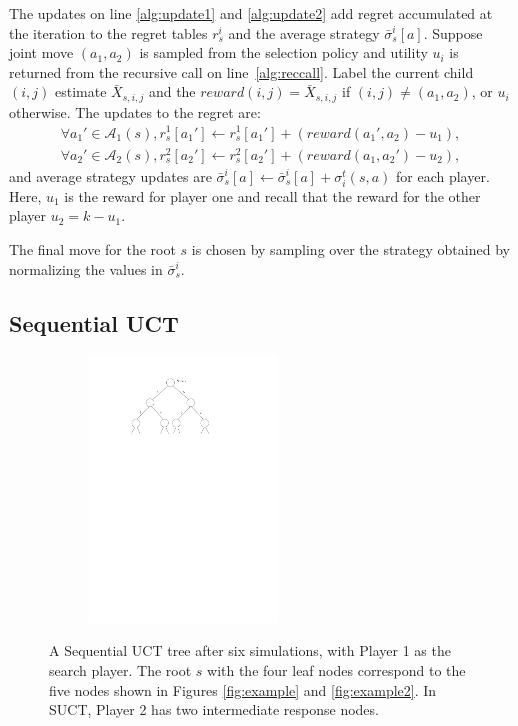 \documentclass[conference]{IEEEtran}
\newcommand{\cA}{\mathcal{A}}
\begin{document}
The updates on line \ref{alg:update1} and \ref{alg:update2} add regret accumulated at the iteration to  
the regret tables $r^i_s$ and the average strategy $\bar{\sigma}^i_s[a]$. 
Suppose joint move $(a_1,a_2)$ is 
sampled from the selection policy and utility $u_i$ is returned from the recursive call on line~\ref{alg:reccall}. 
Label the current child $(i,j)$ estimate $\bar{X}_{s,i,j}$ and the $reward(i,j) = \bar{X}_{s,i,j}$ if 
$(i,j) \not= (a_1,a_2)$, or $u_i$ otherwise. The updates to the regret are:
\begin{eqnarray*}
\forall a_1' \in \cA_1(s),  r^1_s[a_1'] \leftarrow r^1_s[a_1'] + ( reward(a_1', a_2) - u_1 ),\\
\forall a_2' \in \cA_2(s),  r^2_s[a_2'] \leftarrow r^2_s[a_2'] + ( reward(a_1, a_2') - u_2 ),
\end{eqnarray*}
\noindent and average strategy updates are $\bar{\sigma}^i_s[a] \leftarrow \bar{\sigma}^i_s[a] + \sigma^t_i(s,a)$ 
for each player. Here, $u_1$ is the reward for player one and recall that the reward for the other player $u_2 = k - u_1$.

The final move for the root $s$ is chosen by sampling over the strategy obtained by 
normalizing the values in $\bar{\sigma}_s^i$. 

\subsection{Sequential UCT}

\begin{figure}[b!]
\centering
\begin{subfigure}{5cm}
\centering
\includegraphics[width=5.0cm]{figures/tree4}\\
\end{subfigure}
\caption{A Sequential UCT tree after six simulations, with Player 1 as the search player. The root $s$ with the four 
leaf nodes correspond to the five nodes shown in Figures \ref{fig:example} and \ref{fig:example2}. In SUCT, Player 2 has two intermediate 
response nodes. \label{fig:example3}}
\end{figure}
\end{document}

